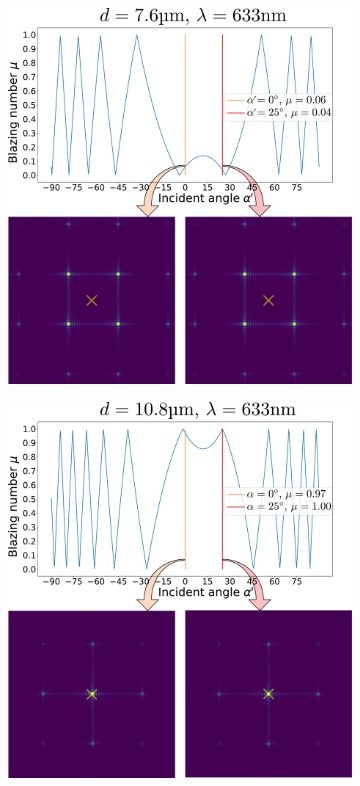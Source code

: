 \documentclass[12pt]{iopart}
\begin{document}
\begin{figure}
  \centering
  \begin{subfigure}{0.49\textwidth}
    \centering
    \includegraphics[width = \textwidth]{images/mu_76.pdf}
  \end{subfigure}
  \begin{subfigure}{0.49\textwidth}
    \centering
    \includegraphics[width = \textwidth]{images/mu_108.pdf}

\end{subfigure}
\end{figure}
\end{document}
